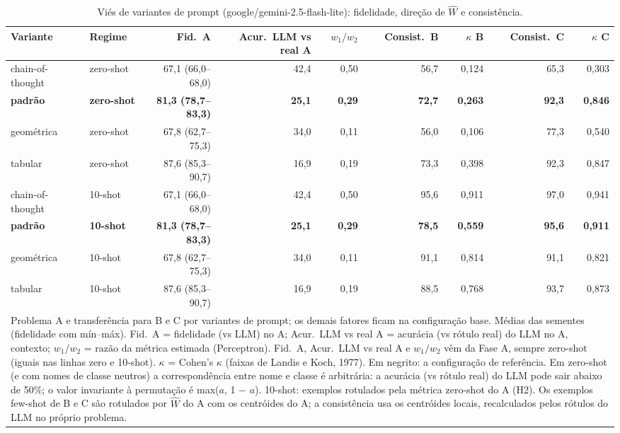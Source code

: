 \begin{table}[htbp]
\centering
\small
\caption{Viés de variantes de prompt (google/gemini-2.5-flash-lite): fidelidade, direção de $\hat{W}$ e consistência.}
\label{tab:bloco1_vies_variantes_prompt_flashlite}
\begin{tabular}{llrrrrrrr}
\toprule
Variante & Regime & Fid.\ A & Acur.\ LLM vs real A & $w_1/w_2$ & Consist.\ B & $\kappa$ B & Consist.\ C & $\kappa$ C \\
\midrule
chain-of-thought & zero-shot & 67,1 (66,0–68,0) & 42,4 & 0,50 & 56,7 & 0,124 & 65,3 & 0,303 \\
\textbf{padrão} & \textbf{zero-shot} & \textbf{81,3 (78,7–83,3)} & \textbf{25,1} & \textbf{0,29} & \textbf{72,7} & \textbf{0,263} & \textbf{92,3} & \textbf{0,846} \\
geométrica & zero-shot & 67,8 (62,7–75,3) & 34,0 & 0,11 & 56,0 & 0,106 & 77,3 & 0,540 \\
tabular & zero-shot & 87,6 (85,3–90,7) & 16,9 & 0,19 & 73,3 & 0,398 & 92,3 & 0,847 \\
\midrule
chain-of-thought & 10-shot & 67,1 (66,0–68,0) & 42,4 & 0,50 & 95,6 & 0,911 & 97,0 & 0,941 \\
\textbf{padrão} & \textbf{10-shot} & \textbf{81,3 (78,7–83,3)} & \textbf{25,1} & \textbf{0,29} & \textbf{78,5} & \textbf{0,559} & \textbf{95,6} & \textbf{0,911} \\
geométrica & 10-shot & 67,8 (62,7–75,3) & 34,0 & 0,11 & 91,1 & 0,814 & 91,1 & 0,821 \\
tabular & 10-shot & 87,6 (85,3–90,7) & 16,9 & 0,19 & 88,5 & 0,768 & 93,7 & 0,873 \\
\bottomrule
\multicolumn{9}{p{0.95\linewidth}}{\footnotesize Problema A e transferência para B e C por variantes de prompt; os demais fatores ficam na configuração base. Médias das sementes (fidelidade com mín–máx). Fid.\ A = fidelidade (vs LLM) no A; Acur.\ LLM vs real A = acurácia (vs rótulo real) do LLM no A, contexto; $w_1/w_2$ = razão da métrica estimada (Perceptron). Fid.\ A, Acur.\ LLM vs real A e $w_1/w_2$ vêm da Fase A, sempre zero-shot (iguais nas linhas zero e 10-shot). $\kappa$ = Cohen's $\kappa$ (faixas de Landis e Koch, 1977). Em negrito: a configuração de referência. Em zero-shot (e com nomes de classe neutros) a correspondência entre nome e classe é arbitrária: a acurácia (vs rótulo real) do LLM pode sair abaixo de 50\%; o valor invariante à permutação é max($a$, 1 $-$ $a$). 10-shot: exemplos rotulados pela métrica zero-shot do A (H2). Os exemplos few-shot de B e C são rotulados por $\hat{W}$ do A com os centróides do A; a consistência usa os centróides locais, recalculados pelos rótulos do LLM no próprio problema.} \\
\end{tabular}
\end{table}
